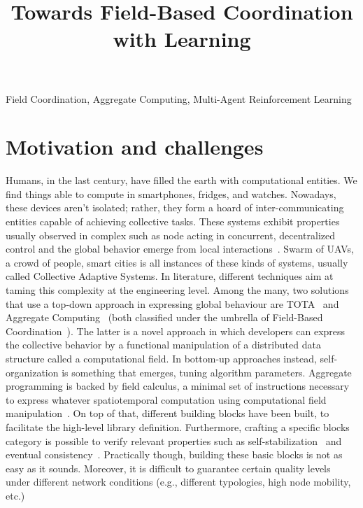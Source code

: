 \documentclass[conference]{IEEEtran}
\begin{document}
\title{Towards Field-Based Coordination with Learning}

\author{
\and
{}
}

\maketitle

\begin{IEEEkeywords}
Field Coordination, Aggregate Computing, Multi-Agent Reinforcement Learning
\end{IEEEkeywords}

\section{Motivation and challenges}
Humans, in the last century, have filled the earth with computational entities. 
%
We find things able to compute in smartphones, fridges, and watches. %
Nowadays, these devices aren't isolated; rather, they form a hoard of inter-communicating entities capable of achieving collective tasks. 
These systems exhibit properties usually observed in complex such as node acting in concurrent, 
decentralized control and the global behavior emerge from local interactions~\cite{DBLP:conf/huc/Ferscha15}. 
Swarm of UAVs, a crowd of people, smart cities is all instances of these kinds of systems, usually called Collective Adaptive Systems.
%
In literature, different techniques aim at taming this complexity at the engineering level.
Among the many, two solutions that use a top-down approach in expressing global behaviour are TOTA~\cite{DBLP:journals/tosem/MameiZ09} and Aggregate Computing~\cite{DBLP:journals/computer/BealPV15} (both classified under the umbrella of Field-Based Coordination~\cite{DBLP:books/daglib/0015276}).
The latter is a novel approach in which developers can express the collective behavior by
a functional manipulation of a distributed data structure called a computational field.
In bottom-up approaches instead, self-organization is something that emerges, tuning algorithm parameters.
Aggregate programming is backed by field calculus, a minimal set of instructions necessary to express whatever spatiotemporal computation using computational field manipulation~\cite{DBLP:conf/coordination/AudritoBDV18}. 
On top of that, different building blocks have been built, to facilitate the high-level library definition.
Furthermore, crafting a specific blocks category is possible to verify relevant properties such as self-stabilization~\cite{DBLP:conf/coordination/ViroliD14} and eventual consistency~\cite{DBLP:conf/saso/BealVPD16}.
Practically though, building these basic blocks is not as easy as it sounds. 
Moreover, it is difficult to guarantee certain quality levels under different network conditions (e.g., different typologies, high node mobility, etc.)
\end{document}
